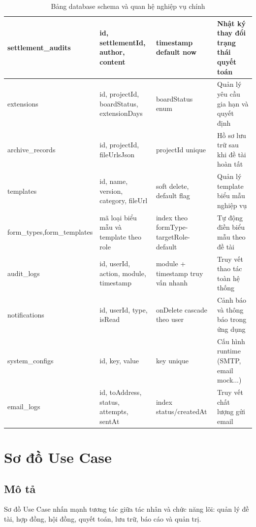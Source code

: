 \documentclass[12pt,a4paper]{report}
\begin{document}
\begin{table}[H]
\begin{tabular}{|L{2.8cm}|L{3.0cm}|L{3.0cm}|L{4.4cm}|}
settlement\_audits & id, settlementId, author, content & timestamp default now & Nhật ký thay đổi trạng thái quyết toán \\ \hline
extensions & id, projectId, boardStatus, extensionDays & boardStatus enum & Quản lý yêu cầu gia hạn và quyết định \\ \hline
archive\_records & id, projectId, fileUrlsJson & projectId unique & Hồ sơ lưu trữ sau khi đề tài hoàn tất \\ \hline
templates & id, name, version, category, fileUrl & soft delete, default flag & Quản lý template biểu mẫu nghiệp vụ \\ \hline
form\_types,\newline form\_templates & mã loại biểu mẫu và template theo role & index theo formType-targetRole-default & Tự động điền biểu mẫu theo đề tài \\ \hline
audit\_logs & id, userId, action, module, timestamp & module + timestamp truy vấn nhanh & Truy vết thao tác toàn hệ thống \\ \hline
notifications & id, userId, type, isRead & onDelete cascade theo user & Cảnh báo và thông báo trong ứng dụng \\ \hline
system\_configs & id, key, value & key unique & Cấu hình runtime (SMTP, email mock...) \\ \hline
email\_logs & id, toAddress, status, attempts, sentAt & index status/createdAt & Truy vết chất lượng gửi email \\ \hline
\end{tabular}
\caption{Bảng database schema và quan hệ nghiệp vụ chính}
\end{table}

\section{Sơ đồ Use Case}
\subsection{Mô tả}
Sơ đồ Use Case nhấn mạnh tương tác giữa tác nhân và chức năng lõi: quản lý đề tài, hợp đồng, hội đồng, quyết toán, lưu trữ, báo cáo và quản trị.
\end{document}
